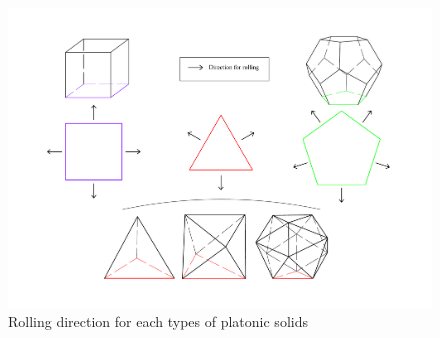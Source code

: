 \noindent  
% 
%
%
\begin{figure}[h]
\centering
	\includegraphics[width=1\textwidth]{image/rollingDir2.pdf}
	\caption{Rolling direction for each types of platonic solids}
	\label{fig:rollingDir}
\end{figure}
%
% 
%
%
%
%
\clearpage
\newpage
